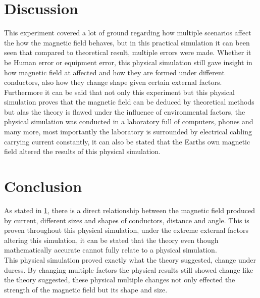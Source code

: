 \documentclass[12pt]{article}
\begin{document}
\section{Discussion}
\label{diss}

This experiment covered a lot of ground regarding how multiple scenarios affect the how the magnetic field behaves, but in this practical simulation it can been seen that compared to theoretical result, multiple errors were made. Whether it be Human error or equipment error, this physical simulation still gave insight in how magnetic field at affected and how they are formed under different conductors, also how they change shape given certain external factors. \\

Furthermore it can be said that not only this experiment but this physical simulation proves that the magnetic field can be deduced by theoretical methods but alas the theory is flawed under the influence of environmental factors, the physical simulation was conducted in a laboratory full of computers, phones and many more, most importantly the laboratory is surrounded by electrical cabling carrying current constantly, it can also be stated that the Earths own magnetic field altered the results of this physical simulation. \\

\section{Conclusion}

As stated in \cref{diss}, there is a direct relationship between the magnetic field produced by current, different sizes and shapes of conductors, distance and angle. This is proven throughout this physical simulation, under the extreme external factors altering this simulation, it can be stated that the theory even though mathematically accurate cannot fully relate to a physical simulation. \\

This physical simulation proved exactly what the theory suggested, change under duress. By changing multiple factors the physical results still showed change like the theory suggested, these physical multiple changes not only effected the strength of the magnetic field but its shape and size.



\end{document}
